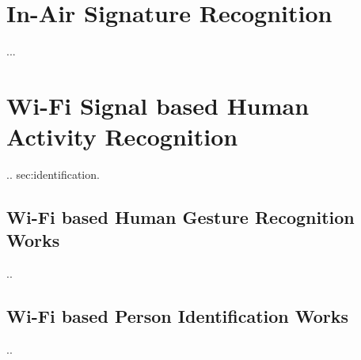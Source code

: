 \label{chp:Survey}

\section{In-Air Signature Recognition}
...
\section{Wi-Fi Signal based Human Activity Recognition}
..
{sec:identification}. 

\subsection{Wi-Fi based Human Gesture Recognition Works}
\label{sec:gesture}
..
\subsection{Wi-Fi based Person Identification Works}
\label{sec:identification}
..